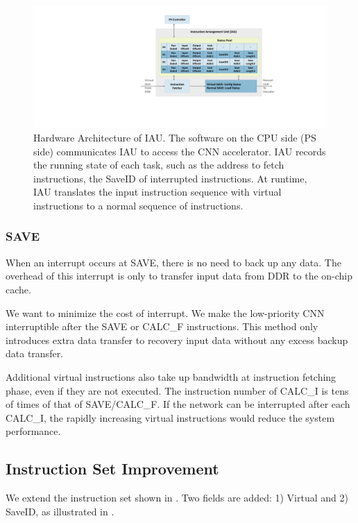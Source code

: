 \begin{figure}[t]
	\centering
	\includegraphics[width=0.99\linewidth]{fig/iau.pdf}
	\caption{Hardware Architecture of IAU. The software on the CPU side (PS side) communicates IAU to access the CNN accelerator. IAU records the running state of each task, such as the address to fetch instructions, the SaveID of interrupted instructions. At runtime, IAU translates the input instruction sequence with virtual instructions to a normal sequence of instructions. }
	\label{fig:IAU}
\end{figure}

\subsubsection{SAVE}
When an interrupt occurs at SAVE, there is no need to back up any data. The overhead of this interrupt is only to transfer input data from DDR to the on-chip cache. 

We want to minimize the cost of interrupt. We make the low-priority CNN interruptible after the SAVE or CALC\_F instructions. This method only introduces extra data transfer to recovery input data without any excess backup data transfer.

Additional virtual instructions also take up bandwidth at instruction fetching phase, even if they are not executed. The instruction number of CALC\_I is tens of times of that of SAVE/CALC\_F. If the network can be interrupted after each CALC\_I, the rapidly increasing virtual instructions would reduce the system performance.

\subsection{ Instruction Set Improvement }
\label{sec:virtualinstr}

We extend the instruction set shown in . Two fields are added: 1) Virtual and 2) SaveID, as illustrated in .

